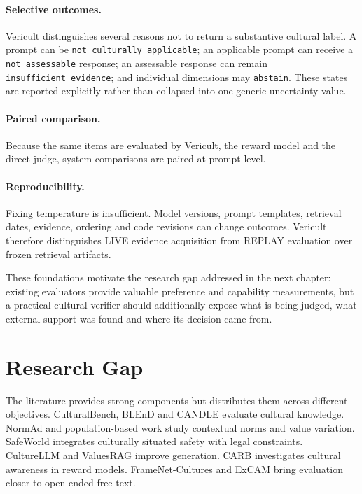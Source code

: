 \paragraph{Selective outcomes.} Vericult distinguishes several reasons not to return a substantive cultural label. A prompt can be \texttt{not\_culturally\_applicable}; an applicable prompt can receive a \texttt{not\_assessable} response; an assessable response can remain \texttt{insufficient\_evidence}; and individual dimensions may \texttt{abstain}. These states are reported explicitly rather than collapsed into one generic uncertainty value.

\paragraph{Paired comparison.} Because the same items are evaluated by Vericult, the reward model and the direct judge, system comparisons are paired at prompt level.

\paragraph{Reproducibility.} Fixing temperature is insufficient. Model versions, prompt templates, retrieval dates, evidence, ordering and code revisions can change outcomes. Vericult therefore distinguishes LIVE evidence acquisition from REPLAY evaluation over frozen retrieval artifacts.

These foundations motivate the research gap addressed in the next chapter: existing evaluators provide valuable preference and capability measurements, but a practical cultural verifier should additionally expose what is being judged, what external support was found and where its decision came from.

\section{Research Gap}
The literature provides strong components but distributes them across different objectives. CulturalBench, BLEnD and CANDLE evaluate cultural knowledge. NormAd and population-based work study contextual norms and value variation. SafeWorld integrates culturally situated safety with legal constraints. CultureLLM and ValuesRAG improve generation. CARB investigates cultural awareness in reward models. FrameNet-Cultures and ExCAM bring evaluation closer to open-ended free text.

